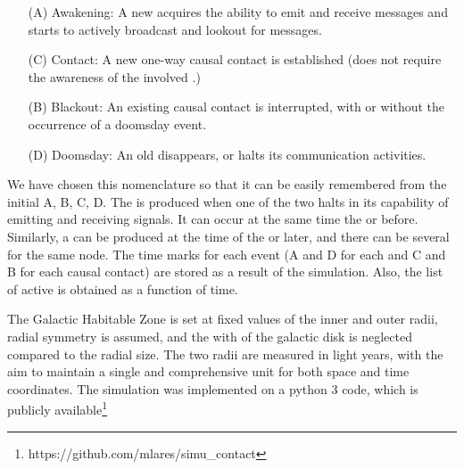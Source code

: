 \begin{enumerate}
   \item[(A)] Awakening: A new \ceti{} acquires the ability to emit
      and receive messages and starts to actively broadcast and
      lookout for messages.
   \item[(C)] Contact: A new one-way causal contact is established
      (does not require the awareness of the involved \cetis{}.)
   \item[(B)] Blackout: An existing causal contact is interrupted,
      with or without the occurrence of a doomsday event.
   \item[(D)] Doomsday: An old \ceti{} disappears, or halts its
      communication activities.
\end{enumerate}

We have chosen this nomenclature so that it can be easily remembered
from the initial A, B, C, D.
%
The \blackout is produced when one of the two \cetis{} halts in its
capability of emitting and receiving signals.
%
It can occur at the same time the \doomsday or before.
%
Similarly, a \ccontact can be produced at the time of the \aawakening
or later, and there can be several \contacts for the same node.
%
The time marks for each event (A and D for each \ceti{} and C and B
for each causal contact) are stored as a result of the simulation.
%
Also, the list of active \cetis{} is obtained as a function of time.
%



The Galactic Habitable Zone is set at fixed values of the inner and outer
radii, radial symmetry is assumed, and the with of the galactic disk
is neglected compared to the radial size.
%
The two radii are measured in light years, with the aim to maintain a
single and comprehensive unit for both space and time coordinates. 
%
The simulation was implemented on a python 3 code, which is publicly
available\footnote{https://github.com/mlares/simu\_contact}

